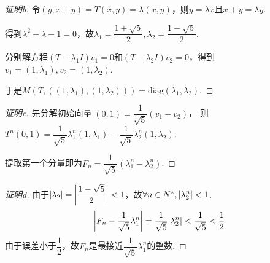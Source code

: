 \begin{proof}[证明b]
    令\((y,x+y)=T(x,y)=\lambda(x,y)\)，则\(y=\lambda x\)且\(x+y=\lambda y\).

    得到\(\lambda^2-\lambda-1=0\)，故\(\lambda_1=\dfrac{1+\sqrt{5}}{2},\lambda_2=\dfrac{1-\sqrt{5}}{2}\).

    分别解方程\((T-\lambda_1 I)v_1=0\)和\((T-\lambda_2 I)v_2=0\)，得到\(v_1=(1,\lambda_1),v_2=(1,\lambda_2)\).

    于是\(M(T,((1,\lambda_1),(1,\lambda_2)))=\mathrm{diag}(\lambda_1,\lambda_2)\).
\end{proof}

\begin{proof}[证明c]
    先分解初始向量.\((0,1)=\dfrac{1}{\sqrt{5}}(v_1-v_2)\)，
    则\(T^n(0,1)=\dfrac{1}{\sqrt{5}}\lambda_1^n(1,\lambda_1)-\dfrac{1}{\sqrt{5}}\lambda_2^n(1,\lambda_2)\).

    提取第一个分量即为\(F_n=\dfrac{1}{\sqrt{5}}(\lambda_1^n-\lambda_2^n)\).
\end{proof}

\begin{proof}[证明d]
    由于\(\abs*{\lambda_2}=\abs*{\dfrac{1-\sqrt{5}}{2}}<1\)，故\(\forall n \in N^*,\abs*{\lambda_2^n}<1\).
    \begin{align*}
        \abs*{F_n-\dfrac{1}{\sqrt{5}}\lambda_1^n}=\dfrac{1}{\sqrt{5}}\abs*{\lambda_2^n}<\dfrac{1}{\sqrt{5}}<\dfrac{1}{2}
    \end{align*}
    由于误差小于\(\dfrac{1}{2}\)，故\(F_n\)是最接近\(\dfrac{1}{\sqrt{5}}\lambda_1^n\)的整数.
\end{proof}

